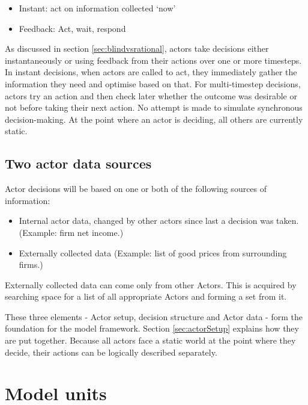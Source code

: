 \begin{itemize}
	\item Instant: act on information collected `now'
	\item Feedback: Act, wait, respond
\end{itemize}

As discussed in section \ref{sec:blindvsrational}, actors take decisions either instantaneously or using feedback from their actions over one or more timesteps. In instant decisions, when actors are called to act, they immediately gather the information they need and optimise based on that. For multi-timestep decisions, actors try an action and then check later whether the outcome was desirable or not before taking their next action. No attempt is made to simulate synchronous decision-making. At the point where an actor is deciding, all others are currently static.

\subsection{Two actor data sources}

Actor decisions will be based on one or both of the following sources of information:

\begin{itemize}
	\item Internal actor data, changed by other actors since last a decision was taken. (Example: firm net income.)
	\item Externally collected data (Example: list of good prices from surrounding firms.)
\end{itemize}

Externally collected data can come only from other Actors. This is acquired by searching space for a list of all appropriate Actors and forming a set from it.

These three elements - Actor setup, decision structure and Actor data - form the foundation for the model framework. Section \ref{sec:actorSetup} explains how they are put together. Because all actors face a static world at the point where they decide, their actions can be logically described separately.

\section{Model units \label{sec:modelunits}}

